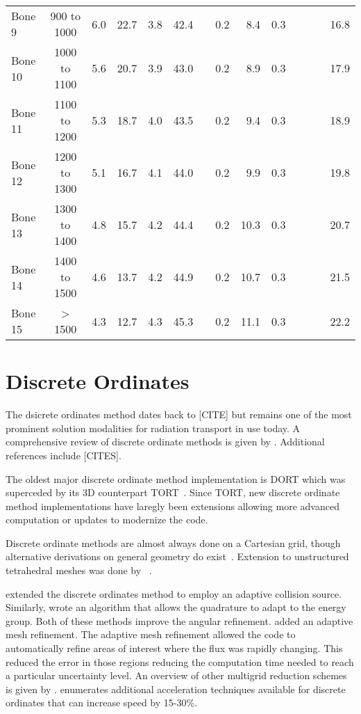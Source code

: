 \begin{sidewaystable}[ht]
\begin{tabular}{l c r r r r r r r r r r r r}
Bone 9      & 900 to 1000   &  6.0 & 22.7 &  3.8 & 42.4 &     & 0.2 &  8.4 & 0.3 &     &     &     & 16.8 \\ 
Bone 10     & 1000 to 1100  &  5.6 & 20.7 &  3.9 & 43.0 &     & 0.2 &  8.9 & 0.3 &     &     &     & 17.9 \\ 
Bone 11     & 1100 to 1200  &  5.3 & 18.7 &  4.0 & 43.5 &     & 0.2 &  9.4 & 0.3 &     &     &     & 18.9 \\ 
Bone 12     & 1200 to 1300  &  5.1 & 16.7 &  4.1 & 44.0 &     & 0.2 &  9.9 & 0.3 &     &     &     & 19.8 \\
Bone 13     & 1300 to 1400  &  4.8 & 15.7 &  4.2 & 44.4 &     & 0.2 & 10.3 & 0.3 &     &     &     & 20.7 \\
Bone 14     & 1400 to 1500  &  4.6 & 13.7 &  4.2 & 44.9 &     & 0.2 & 10.7 & 0.3 &     &     &     & 21.5 \\  
Bone 15     & > 1500        &  4.3 & 12.7 &  4.3 & 45.3 &     & 0.2 & 11.1 & 0.3 &     &     &     & 22.2 \\[1ex]
\hline
\end{tabular}
\label{table:ctmap}
\end{sidewaystable}

\section{Discrete Ordinates}\label{sec:discordlit}
The dsicrete ordinates method dates back to [CITE] but remains one of the most prominent solution modalities for radiation transport in use today. A comprehensive review of discrete ordinate methods is given by \citet{ref:lewise}. Additional references include [CITES].

The oldest major discrete ordinate method implementation is DORT which was superceded by its 3D counterpart TORT~\citep{ref:rhoadesw}. Since TORT, new discrete ordinate method implementations have laregly been extensions allowing more advanced computation or updates to modernize the code.

Discrete ordinate methods are almost always done on a Cartesian grid, though alternative derivations on general geometry do exist~\citep{ref:dehart}. Extension to unstructured tetrahedral meshes was done by ~\citet{ref:wareingt}.

\citet{ref:waltersw} extended the discrete ordinates method to employ an adaptive collision source. Similarly, \citet{ref:ahrensc} wrote an algorithm that allows the quadrature to adapt to the energy group. Both of these methods improve the angular refinement. \citet{ref:ibrahima} added an adaptive mesh refinement. The adaptive mesh refinement allowed the code to automatically refine areas of interest where the flux was rapidly changing. This reduced the error in those regions reducing the computation time needed to reach a particular uncertainty level. An overview of other multigrid reduction schemes is given by \citet{ref:leeb}. \citet{ref:efremenkod} enumerates additional acceleration techniques available for discrete ordinates that can increase speed by 15-30\%.

